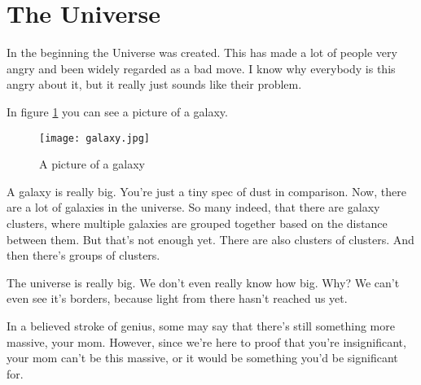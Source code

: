 
\section*{The Universe}
In the beginning the Universe was created. This has made a lot of people very angry and been widely regarded as a bad move.
I know why everybody is this angry about it, but it really just sounds like their problem.

In figure \ref{fig:universe} you can see a picture of a galaxy.

\begin{figure}[h]
  \center
  \texttt{[image: galaxy.jpg]}
  \caption{A picture of a galaxy}
  \label{fig:universe}
\end{figure}

A galaxy is really big. You're just a tiny spec of dust in comparison. Now, there are a lot of galaxies in the universe.
So many indeed, that there are galaxy clusters, where multiple galaxies are grouped together based on the distance between them.
But that's not enough yet. There are also clusters of clusters. And then there's groups of clusters.

The universe is really big. We don't even really know how big. Why? We can't even see it's borders, because light from there hasn't reached us yet.

In a believed stroke of genius, some may say that there's still something more massive, your mom. However, since we're here to proof that you're insignificant,
your mom can't be this massive, or it would be something you'd be significant for.